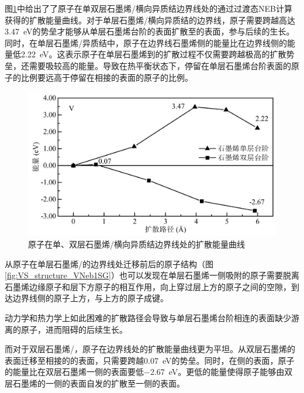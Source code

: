     图\ref{fig:VS_DFT_NEB_V_GtVSe}中给出了了原子在单双层石墨烯/横向异质结边界线处的通过过渡态NEB计算获得的扩散能量曲线。对于单层石墨烯/横向异质结的边界线，原子需要跨越高达\SI{3.47}{\electronvolt}的势垒才能够从单层石墨烯台阶的表面扩散至的表面，参与后续的生长。同时，在单层石墨烯/异质结中，原子在边界线石墨烯侧的能量比在边界线侧的能量低\SI{2.22}{\electronvolt}。这表示原子在单层石墨烯到的扩散过程不仅需要跨越极高的扩散势垒，还需要吸较高的能量。导致在热平衡状态下，停留在单层石墨烯台阶表面的原子的比例要远高于停留在相接的表面的原子的比例。

    \begin{figure}[htb]
        \includegraphics{pic/VS_DFT_NEB_V_GtVSe.png}
        \captionsetup{width=\textwidth}
        \caption{原子在单、双层石墨烯/横向异质结边界线处的扩散能量曲线}
        \label{fig:VS_DFT_NEB_V_GtVSe}
    \end{figure}
    

    从原子在单层石墨烯/的边界线处迁移前后的原子结构（图\ref{fig:VS_structure_VNeb1SG}）也可以发现在单层石墨烯一侧吸附的原子需要脱离石墨烯边缘原子和层下方原子的相互作用，向上穿过层上方的原子之间的空隙，到达边界线侧的原子上方，与上方的原子成键。

    动力学和热力学上如此困难的扩散路径会导致与单层石墨烯台阶相连的表面缺少游离的原子，进而阻碍的后续生长。

    而对于双层石墨烯/，原子在边界线处的扩散能量曲线更为平坦。从双层石墨烯的表面迁移至相接的的表面，只需要跨越\SI{0.07}{\electronvolt}的势垒。同时，在侧的表面，原子的能量比在双层石墨烯一侧的表面要低\SI{-2.67}{\electronvolt}。更低的能量使得原子能够由双层石墨烯的一侧的表面自发的扩散至一侧的表面。

